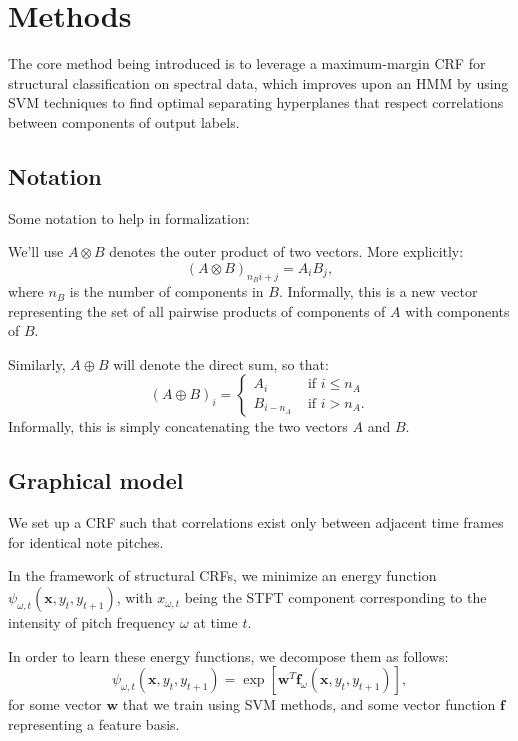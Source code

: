 \documentclass{article}
\begin{document}
\section{Methods}
\newcommand{\x}{\mathbf{x}}
\newcommand{\y}{\mathbf{y}}
\newcommand{\w}{\mathbf{w}}
\newcommand{\f}{\mathbf{f}}
\newcommand{\t}{\mathbf{t}}

The core method being introduced is to leverage a
maximum-margin CRF \cite{Taskar03max-marginmarkov} for
structural classification on spectral data, which improves
upon an HMM by using SVM techniques to find optimal separating hyperplanes
that respect correlations between components of output labels.


\subsection{Notation}
Some notation to help in formalization:

We'll use $A \otimes B$ denotes the outer product of two vectors. More
explicitly:
\[ (A \otimes B)_{n_Bi+j} = A_iB_j, \]
where $n_B$ is the number of components in $B$. Informally, this is
a new vector representing the set of all pairwise products of components of
$A$ with components of $B$.

Similarly, $A \oplus B$ will denote the direct sum, so that:
\[ (A \oplus B)_i =
      \begin{cases} A_i & \text{ if $i \le n_A$} \\
                    B_{i-n_A} & \text{ if $i > n_A$}.
      \end{cases}
\]
Informally, this is simply concatenating the two vectors $A$ and $B$.

\subsection{Graphical model}
We set up a CRF such that correlations exist only between adjacent time
frames for identical note pitches.

In the framework of structural CRFs, we minimize
an energy function $\psi_{\omega,t}(\x,y_t,y_{t+1})$,
with $x_{\omega,t}$ being the STFT component corresponding to the intensity
of pitch frequency $\omega$ at time $t$. 

In order to learn these energy functions, we decompose them as follows:
\[ \psi_{\omega,t}(\x,y_t,y_{t+1}) = \exp[\w^T\f_{\omega}(\x,y_t,y_{t+1})], \]
for some vector $\w$ that we train using SVM methods, and some vector
function $\f$ representing a feature basis.
\end{document}
